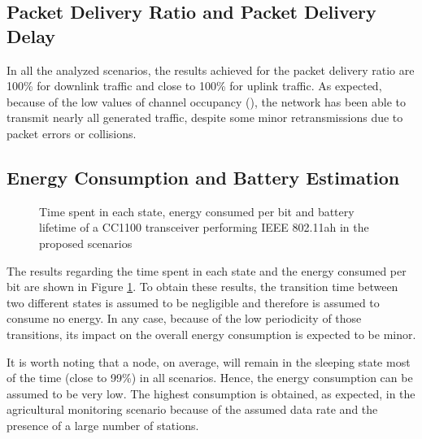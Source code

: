 \documentclass[]{article}
\begin{document}
\subsection{Packet Delivery Ratio and Packet Delivery Delay}

In all the analyzed scenarios, the results achieved for the packet delivery ratio are 100\% for downlink traffic and close to 100\% for uplink traffic. As expected, because of the low values of channel occupancy (), the network has been able to transmit nearly all generated traffic, despite some minor retransmissions due to packet errors or collisions.  

\subsection{Energy Consumption and Battery Estimation}
\renewcommand\thefigure{3} 
\begin{figure}[p]
\begin{center}
\caption{Time spent in each state, energy consumed per bit and battery lifetime of a CC1100 transceiver performing IEEE 802.11ah in the proposed scenarios} \label{fig:energy}
\end{center}
\end{figure}

The results regarding the time spent in each state and the energy consumed per bit are shown in Figure \ref{fig:energy}. To obtain these results, the transition time between two different states is assumed to be negligible and therefore is assumed to consume no energy. In any case, because of the low periodicity of those transitions, its impact on the overall energy consumption is expected to be minor.

It is worth noting that a node, on average, will remain in the sleeping state most of the time (close to 99\%) in all scenarios. Hence, the energy consumption can be assumed to be very low. The highest consumption is obtained, as expected, in the agricultural monitoring scenario because of the assumed data rate and the presence of a large number of stations.
\end{document}
